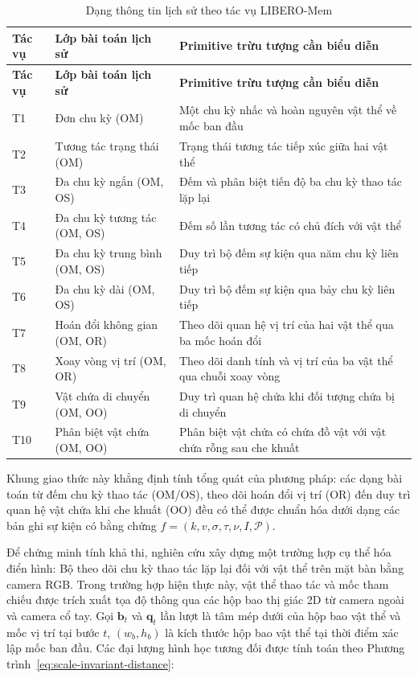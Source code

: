 \begingroup\small\setlength{\tabcolsep}{4pt}\renewcommand{\arraystretch}{1.12}
\begin{longtable}{|>{\raggedright\arraybackslash}p{}|>{\raggedright\arraybackslash}p{}|>{\raggedright\arraybackslash}p{}|}
\caption{Dạng thông tin lịch sử theo tác vụ LIBERO-Mem}\label{tab:memory-task-families}\\
\hline
\textbf{Tác vụ} & \textbf{Lớp bài toán lịch sử} & \textbf{Primitive trừu tượng cần biểu diễn} \\ \hline
\endfirsthead
\hline
\textbf{Tác vụ} & \textbf{Lớp bài toán lịch sử} & \textbf{Primitive trừu tượng cần biểu diễn} \\ \hline
\endhead
\hline\endfoot
T1 & Đơn chu kỳ (OM) & Một chu kỳ nhấc và hoàn nguyên vật thể về mốc ban đầu \\ \hline
T2 & Tương tác trạng thái (OM) & Trạng thái tương tác tiếp xúc giữa hai vật thể \\ \hline
T3 & Đa chu kỳ ngắn (OM, OS) & Đếm và phân biệt tiến độ ba chu kỳ thao tác lặp lại \\ \hline
T4 & Đa chu kỳ tương tác (OM, OS) & Đếm số lần tương tác có chủ đích với vật thể \\ \hline
T5 & Đa chu kỳ trung bình (OM, OS) & Duy trì bộ đếm sự kiện qua năm chu kỳ liên tiếp \\ \hline
T6 & Đa chu kỳ dài (OM, OS) & Duy trì bộ đếm sự kiện qua bảy chu kỳ liên tiếp \\ \hline
T7 & Hoán đổi không gian (OM, OR) & Theo dõi quan hệ vị trí của hai vật thể qua ba mốc hoán đổi \\ \hline
T8 & Xoay vòng vị trí (OM, OR) & Theo dõi danh tính và vị trí của ba vật thể qua chuỗi xoay vòng \\ \hline
T9 & Vật chứa di chuyển (OM, OO) & Duy trì quan hệ chứa khi đối tượng chứa bị di chuyển \\ \hline
T10 & Phân biệt vật chứa (OM, OO) & Phân biệt vật chứa có chứa đồ vật với vật chứa rỗng sau che khuất \\ \hline
\end{longtable}
\endgroup

Khung giao thức này khẳng định tính tổng quát của phương pháp: các dạng bài toán từ đếm chu kỳ thao tác (OM/OS), theo dõi hoán đổi vị trí (OR) đến duy trì quan hệ vật chứa khi che khuất (OO) đều có thể được chuẩn hóa dưới dạng các bản ghi sự kiện có bằng chứng $f = (k, v, \sigma, \tau, \nu, I, \mathcal P)$.

Để chứng minh tính khả thi, nghiên cứu xây dựng một trường hợp cụ thể hóa điển hình: Bộ theo dõi chu kỳ thao tác lặp lại đối với vật thể trên mặt bàn bằng camera RGB. Trong trường hợp hiện thực này, vật thể thao tác và mốc tham chiếu được trích xuất tọa độ thông qua các hộp bao thị giác 2D từ camera ngoài và camera cổ tay. Gọi $\mathbf b_t$ và $\mathbf q_t$ lần lượt là tâm mép dưới của hộp bao vật thể và mốc vị trí tại bước $t$, $(w_b, h_b)$ là kích thước hộp bao vật thể tại thời điểm xác lập mốc ban đầu. Các đại lượng hình học tương đối được tính toán theo Phương trình~\eqref{eq:scale-invariant-distance}:

